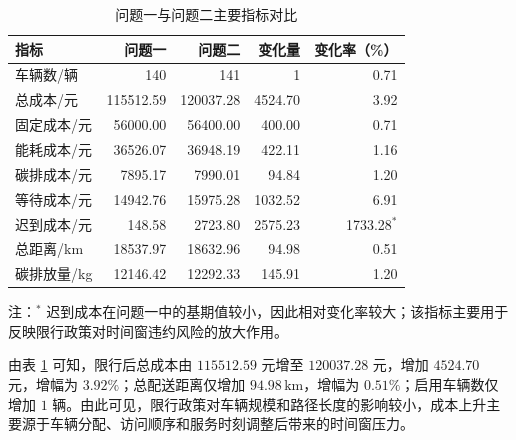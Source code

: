 \documentclass[withoutpreface,bwprint]{cumcmthesis} %
\begin{document}
\begin{table}[!htbp]
\centering
\caption{问题一与问题二主要指标对比}
\label{tab:p1_p2_compare}
\vspace{0.15em}

\renewcommand{\arraystretch}{1.03}
\setlength{\tabcolsep}{6.8pt}
\setlength{\aboverulesep}{0.25ex}
\setlength{\belowrulesep}{0.25ex}
\setlength{\cmidrulesep}{0.15ex}
\small

\begin{tabular}{lrrrr}
\toprule
\rowcolor{tablehead}
\textbf{指标} & \textbf{问题一} & \textbf{问题二} & \textbf{变化量} & \textbf{变化率（\%）} \\
\midrule
车辆数/辆      & 140       & 141       & 1       & 0.71 \\
\rowcolor{tablerow}
总成本/元      & 115512.59 & 120037.28 & 4524.70 & 3.92 \\
固定成本/元    & 56000.00  & 56400.00  & 400.00  & 0.71 \\
\rowcolor{tablerow}
能耗成本/元    & 36526.07  & 36948.19  & 422.11  & 1.16 \\
碳排成本/元    & 7895.17   & 7990.01   & 94.84   & 1.20 \\
\rowcolor{tablerow}
等待成本/元    & 14942.76  & 15975.28  & 1032.52 & 6.91 \\
迟到成本/元    & 148.58    & 2723.80   & 2575.23 & 1733.28$^{*}$ \\
\rowcolor{tablerow}
总距离/km      & 18537.97  & 18632.96  & 94.98   & 0.51 \\
碳排放量/kg    & 12146.42  & 12292.33  & 145.91  & 1.20 \\
\bottomrule
\end{tabular}

\vspace{0.15em}
\begin{minipage}{0.86\textwidth}
\footnotesize
\setlength{\parindent}{0pt}
注：$^{*}$ 迟到成本在问题一中的基期值较小，因此相对变化率较大；该指标主要用于反映限行政策对时间窗违约风险的放大作用。
\end{minipage}

\vspace{-0.1em}
\end{table}

由表 \ref{tab:p1_p2_compare} 可知，限行后总成本由 $115512.59$ 元增至 $120037.28$ 元，增加 $4524.70$ 元，增幅为 $3.92\%$；总配送距离仅增加 $94.98\,\mathrm{km}$，增幅为 $0.51\%$；启用车辆数仅增加 $1$ 辆。由此可见，限行政策对车辆规模和路径长度的影响较小，成本上升主要源于车辆分配、访问顺序和服务时刻调整后带来的时间窗压力。
\end{document}
